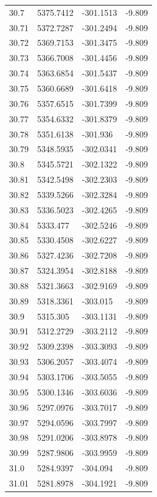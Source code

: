 \begin{table}[H]
\begin{tabular}{llll}
30.7 & 5375.7412 & -301.1513 & -9.809 \\
30.71 & 5372.7287 & -301.2494 & -9.809 \\
30.72 & 5369.7153 & -301.3475 & -9.809 \\
30.73 & 5366.7008 & -301.4456 & -9.809 \\
30.74 & 5363.6854 & -301.5437 & -9.809 \\
30.75 & 5360.6689 & -301.6418 & -9.809 \\
30.76 & 5357.6515 & -301.7399 & -9.809 \\
30.77 & 5354.6332 & -301.8379 & -9.809 \\
30.78 & 5351.6138 & -301.936 & -9.809 \\
30.79 & 5348.5935 & -302.0341 & -9.809 \\
30.8 & 5345.5721 & -302.1322 & -9.809 \\
30.81 & 5342.5498 & -302.2303 & -9.809 \\
30.82 & 5339.5266 & -302.3284 & -9.809 \\
30.83 & 5336.5023 & -302.4265 & -9.809 \\
30.84 & 5333.477 & -302.5246 & -9.809 \\
30.85 & 5330.4508 & -302.6227 & -9.809 \\
30.86 & 5327.4236 & -302.7208 & -9.809 \\
30.87 & 5324.3954 & -302.8188 & -9.809 \\
30.88 & 5321.3663 & -302.9169 & -9.809 \\
30.89 & 5318.3361 & -303.015 & -9.809 \\
30.9 & 5315.305 & -303.1131 & -9.809 \\
30.91 & 5312.2729 & -303.2112 & -9.809 \\
30.92 & 5309.2398 & -303.3093 & -9.809 \\
30.93 & 5306.2057 & -303.4074 & -9.809 \\
30.94 & 5303.1706 & -303.5055 & -9.809 \\
30.95 & 5300.1346 & -303.6036 & -9.809 \\
30.96 & 5297.0976 & -303.7017 & -9.809 \\
30.97 & 5294.0596 & -303.7997 & -9.809 \\
30.98 & 5291.0206 & -303.8978 & -9.809 \\
30.99 & 5287.9806 & -303.9959 & -9.809 \\
31.0 & 5284.9397 & -304.094 & -9.809 \\
31.01 & 5281.8978 & -304.1921 & -9.809 \\

\end{tabular}
\end{table}
